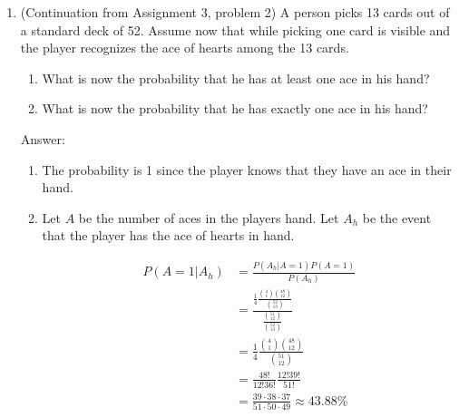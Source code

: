 \documentclass{article}
\begin{document}
\begin{enumerate}
\begin{enumerate}
\end{enumerate}

\item

(Continuation from Assignment 3, problem 2) A person picks 13 cards out of a standard deck of 52.  Assume now that while picking one card is visible and the player recognizes the ace of hearts among the 13 cards.

\begin{enumerate}
\item

What is now the probability that he has at least one ace in his hand?

\item

What is now the probability that he has exactly one ace in his hand?

\end{enumerate}

Answer:

\begin{enumerate}
\item The probability is 1 since the player knows that they have an ace in their hand.

\item Let $A$ be the number of aces in the players hand. Let $A_h$ be the event that the player has the ace of hearts in hand.

\begin{align*}
P(A = 1 | A_h) &= \frac{P(A_h | A = 1)P(A = 1)}{P(A_h)} \\
&= \frac{\frac{1}{4}\frac{\binom{4}{1}\binom{48}{12}}{\binom{52}{13}}}{\frac{\binom{51}{12}}{\binom{52}{13}}} \\
&= \frac{1}{4}\frac{\binom{4}{1}\binom{48}{12}}{\binom{51}{12}} \\
&= \frac{48!}{12!36!}\frac{12!39!}{51!} \\
&= \frac{39 \cdot 38 \cdot 37}{51 \cdot 50 \cdot 49} \approx 43.88\%
\end{align*}


\end{enumerate}

\end{enumerate}
\end{document}
